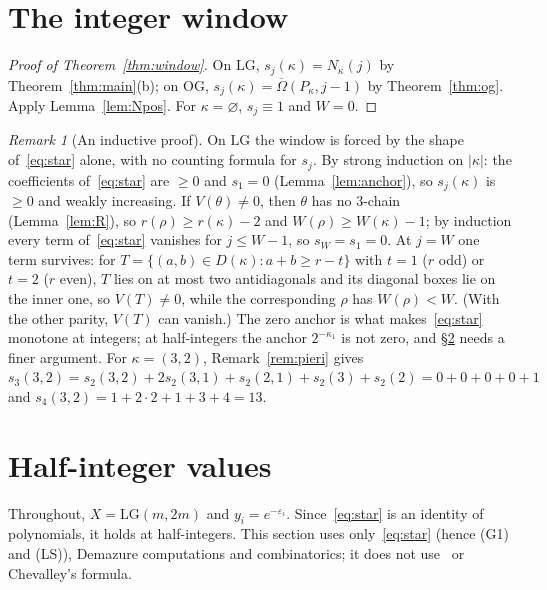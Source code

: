 \documentclass[submission]{FPSAC2027}
\theoremstyle{definition}
\theoremstyle{remark}
\newtheorem{remark}[theorem]{Remark}
\newcommand{\LG}{\mathrm{LG}}
\newcommand{\OG}{\mathrm{OG}}
\newcommand{\Omb}{\overline{\Omega}}
\begin{document}
\section{The integer window}\label{sec:window}

\begin{proof}[Proof of Theorem~\ref{thm:window}]
On $\LG$, $s_j(\kappa)=N_\kappa(j)$ by Theorem~\ref{thm:main}(b); on $\OG$,
$s_j(\kappa)=\Omb(P_\kappa,j-1)$ by Theorem~\ref{thm:og}. Apply Lemma~\ref{lem:Npos}. For
$\kappa=\varnothing$, $s_j\equiv1$ and $W=0$.
\end{proof}

\begin{remark}[An inductive proof]\label{rem:window-ind}
On $\LG$ the window is forced by the shape of~\eqref{eq:star} alone, with no counting formula
for $s_j$. By strong induction on $|\kappa|$: the coefficients of~\eqref{eq:star} are $\ge0$ and $s_1=0$
(Lemma~\ref{lem:anchor}), so $s_j(\kappa)$ is $\ge0$ and weakly increasing. If $V(\theta)\ne0$, then
$\theta$ has no $3$-chain (Lemma~\ref{lem:R}), so $r(\rho)\ge r(\kappa)-2$ and $W(\rho)\ge W(\kappa)-1$;
by induction every term of~\eqref{eq:star} vanishes for $j\le W-1$, so $s_W=s_1=0$. At $j=W$ one
term survives: for $T=\{(a,b)\in D(\kappa):a+b\ge r-t\}$ with $t=1$ ($r$ odd) or $t=2$ ($r$ even),
$T$ lies on at most two antidiagonals and its diagonal boxes lie on the inner one, so $V(T)\ne0$,
while the corresponding $\rho$ has $W(\rho)<W$. (With the other parity, $V(T)$ can vanish.) The
zero anchor is what makes~\eqref{eq:star} monotone at integers; at half-integers the anchor
$2^{-\kappa_1}$ is not zero, and \S\ref{sec:half} needs a finer argument. For $\kappa=(3,2)$,
Remark~\ref{rem:pieri} gives
$s_3(3,2)=s_2(3,2)+2s_2(3,1)+s_2(2,1)+s_2(3)+s_2(2)=0+0+0+0+1$ and
$s_4(3,2)=1+2\cdot2+1+3+4=13$.
\end{remark}

\section{Half-integer values}\label{sec:half}

Throughout, $X=\LG(m,2m)$ and $y_i=e^{-\varepsilon_i}$. Since~\eqref{eq:star} is an identity of
polynomials, it holds at half-integers. This section uses only~\eqref{eq:star} (hence (G1) and
(LS)), Demazure computations and combinatorics; it does not use~\cite{BR12} or Chevalley's formula.
\end{document}
